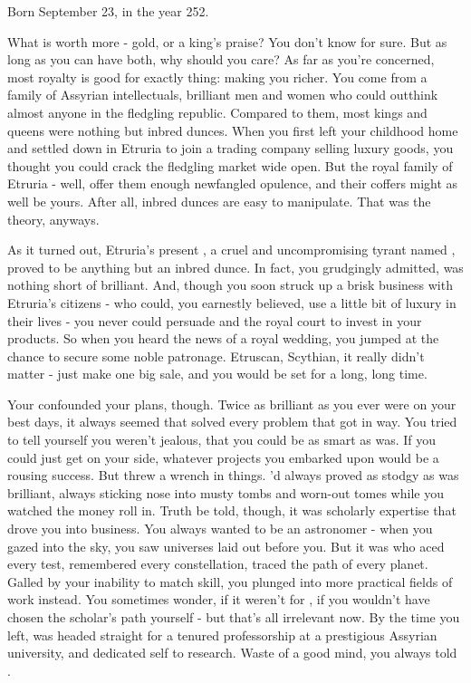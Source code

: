 \documentclass[char]{Kos}
\begin{document}
\name{\cMerchant{}}

Born September 23, in the year 252.

What is worth more - gold, or a king's praise? You don't know for sure. But as long as you can have both, why should you care? As far as you're concerned, most royalty is good for exactly thing: making you richer. You come from a family of Assyrian intellectuals, brilliant men and women who could outthink almost anyone in the fledgling republic. Compared to them, most kings and queens were nothing but inbred dunces. When you first left your childhood home and settled down in Etruria to join a trading company selling luxury goods, you thought you could crack the fledgling market wide open. But the royal family of Etruria - well, offer them enough newfangled opulence, and their coffers might as well be yours. After all, inbred dunces are easy to manipulate. That was the theory, anyways. 

As it turned out, Etruria's present \cEtruriaKing{\monarch}, a cruel and uncompromising tyrant named \cEtruriaKing{}, proved to be anything but an inbred dunce. In fact, you grudgingly admitted, \cEtruriaKing{\they} was nothing short of brilliant. And, though you soon struck up a brisk business with Etruria's citizens - who could, you earnestly believed, use a little bit of luxury in their lives - you never could persuade \cEtruriaKing{} and the royal court to invest in your products. So when you heard the news of a royal wedding, you jumped at the chance to secure some noble patronage. Etruscan, Scythian, it really didn't matter - just make one big sale, and you would be set for a long, long time.

Your \cAnarchist{\sibling} \cAnarchist{} confounded your plans, though. Twice as brilliant as you ever were on your best days, it always seemed that \cAnarchist{\they} solved every problem that got in \cAnarchist{\their} way. You tried to tell yourself you weren't jealous, that you could be as smart as \cAnarchist{\they} was. If you could just get \cAnarchist{\them} on your side, whatever projects you embarked upon would be a rousing success. But \cAnarchist{\they} threw a wrench in things. \cAnarchist{\they}'d always proved as stodgy as \cAnarchist{\they} was brilliant, always sticking \cAnarchist{\their} nose into musty tombs and worn-out tomes while you watched the money roll in. Truth be told, though, it was \cAnarchist{\their} scholarly expertise that drove you into business. You always wanted to be an astronomer - when you gazed into the sky, you saw universes laid out before you. But it was \cAnarchist{} who aced every test, remembered every constellation, traced the path of every planet. Galled by your inability to match \cAnarchist{\their} skill, you plunged into more practical fields of work instead. You sometimes wonder, if it weren't for \cAnarchist{\nickname}, if you wouldn't have chosen the scholar's path yourself - but that's all irrelevant now. By the time you left, \cAnarchist{\they} was headed straight for a tenured professorship at a prestigious Assyrian university, and dedicated \cAnarchist{\them}self to research. Waste of a good mind, you always told \cAnarchist{\them}.
\end{document}
